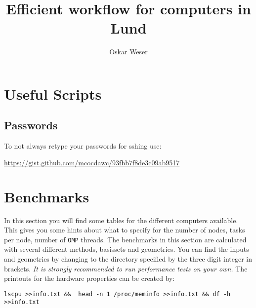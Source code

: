 \documentclass[12pt,a4paper,bibliography=totocnumbered,listof=totocnumbered]{scrartcl}
\begin{document}
\title{Efficient workflow for computers in Lund}
\date{}
\author{Oskar Weser}
\date{}
\maketitle
\subsection*{}

\thispagestyle{empty}

\tableofcontents
\thispagestyle{empty}
\newpage
\setcounter{page}{1}
%
\pagebreak

\section{Useful Scripts}
\subsection{Passwords}

To not always retype your passwords for sshing use:

\url{https://gist.github.com/mcocdawc/93fbb7f8de3c09ab9517}


\section{Benchmarks}

In this section you will find some tables for the different computers available.
This gives you some hints about what to specify for the number of nodes, tasks per node, 
number of \verb!OMP! threads.
The benchmarks in this section are calculated with several different methods, basissets and geometries.
You can find the inputs and geometries by changing to the directory specified by the three digit integer in brackets.
\emph{It is strongly recommended to run performance tests on your own.}
The printouts for the hardware properties can be created by:

\verb!lscpu >>info.txt &&  head -n 1 /proc/meminfo >>info.txt && df -h >>info.txt!
\end{document}
